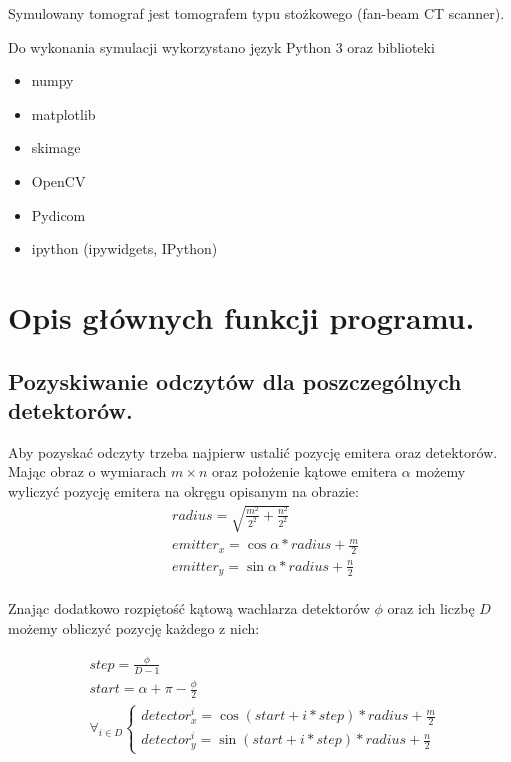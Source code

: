 \documentclass[a4paper, 11pt]{article}
\begin{document}
Symulowany tomograf jest tomografem typu stożkowego (fan-beam CT scanner).

Do wykonania symulacji wykorzystano język Python 3 oraz biblioteki

\begin{itemize}
	\item numpy
	\item matplotlib
	\item skimage
	\item OpenCV
	\item Pydicom
	\item ipython (ipywidgets, IPython)
\end{itemize}

\section{Opis głównych funkcji programu.}

\subsection{Pozyskiwanie odczytów dla poszczególnych detektorów.}

Aby pozyskać odczyty trzeba najpierw ustalić pozycję emitera oraz detektorów.\\
Mając obraz o wymiarach $m \times n$ oraz położenie kątowe emitera $\alpha$
możemy wyliczyć pozycję emitera na okręgu opisanym na obrazie:
\begin{align*}
	 & radius = \sqrt{\frac{m^2}{2^2} + \frac{n^2}{2^2}} \\
	 & emitter_x = \cos\alpha * radius + \frac{m}{2}     \\
	 & emitter_y = \sin\alpha * radius + \frac{n}{2}     \\
\end{align*}

\newpage

Znając dodatkowo rozpiętość kątową wachlarza detektorów $\phi$ oraz ich liczbę $D$ możemy obliczyć pozycję każdego z nich:

\begin{align*}
	 & step = \frac{\phi}{D - 1}             \\
	 & start = \alpha + \pi - \frac{\phi}{2} \\
	 & \forall_{i \in D}
	\begin{cases}
		detector^{i}_{x} = \cos(start + i * step) * radius + \frac{m}{2} \\
		detector^{i}_{y} = \sin(start + i * step) * radius + \frac{n}{2}
	\end{cases}
\end{align*}
\end{document}

